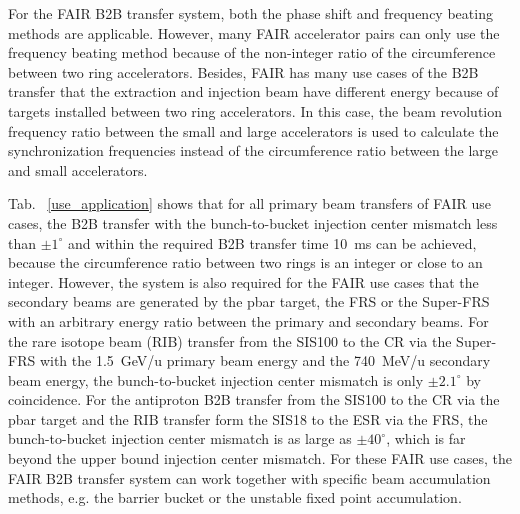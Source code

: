 For the FAIR B2B transfer system, both the phase shift and frequency beating methods are applicable. However, many FAIR accelerator pairs can only use the frequency beating method because of the non-integer ratio of the circumference between two ring accelerators. Besides, FAIR has many use cases of the B2B transfer that the extraction and injection beam have different energy because of targets installed between two ring accelerators. In this case, the beam revolution frequency ratio between the small and large accelerators is used to calculate the synchronization frequencies instead of the circumference ratio between the large and small accelerators. 

Tab. ~\ref{use_application} shows that for all primary beam transfers of FAIR use cases, the B2B transfer with the bunch-to-bucket injection center mismatch less than $\pm1^\circ$ and within the required B2B transfer time \SI{10}{\ms} can be achieved, because the circumference ratio between two rings is an integer or close to an integer. However, the system is also required for the FAIR use cases that the secondary beams are generated by the pbar target, the FRS or the Super-FRS with an arbitrary energy ratio between the primary and secondary beams. For the rare isotope beam (RIB) transfer from the SIS100 to the CR via the Super-FRS with the \SI{1.5}{GeV/u} primary beam energy and the \SI{740}{MeV/u} secondary beam energy, the bunch-to-bucket injection center mismatch is only $\pm2.1^\circ$ by coincidence. For the antiproton B2B transfer from the SIS100 to the CR via the pbar target and the RIB transfer form the SIS18 to the ESR via the FRS, the bunch-to-bucket injection center mismatch is as large as $\pm40^\circ$, which is far beyond the upper bound injection center mismatch. For these FAIR use cases, the FAIR B2B transfer system can work together with specific beam accumulation methods, e.g. the barrier bucket or the unstable fixed point accumulation.



